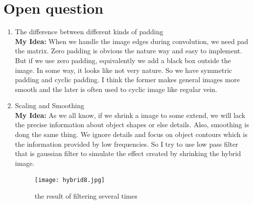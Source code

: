 \section{Open question}
\begin{enumerate}
	\item The difference between different kinds of padding\\
	\textbf{My Idea:} When we handle the image edges during convolution, we need pad the matrix. Zero padding is obvious the nature way and easy to implement. But if we use zero padding, equivalently we add a black box outside the image. In some way, it looks like not very nature. So we have symmetric padding and cyclic padding. I think the former makes general images more smooth and the later is often used to cyclic image like regular vein.
	\newpage
	\item Scaling and Smoothing\\
	\textbf{My Idea:} As we all know, if we shrink a image to some extend, we will lack the precise information about object shapes or else details. Also, smoothing is dong the same thing. We ignore details and focus on object contours which is the information provided by low frequencies. So I try to use low pass filter that is gaussian filter to simulate the effect created by shrinking the hybrid image.
	\begin{figure}[h]
		\centering
		\texttt{[image: hybrid8.jpg]}
		\caption{the result of filtering several times}
	\end{figure} 
\end{enumerate}
